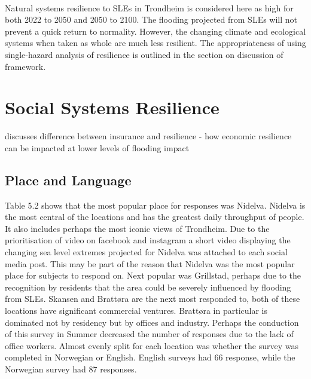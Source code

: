 \paragraph{}
Natural systems resilience to SLEs in Trondheim is considered here as high for both 2022 to 2050 and 2050 to 2100. The flooding projected from SLEs will not prevent a quick return to normality. However, the changing climate and ecological systems when taken as whole are much less resilient. The appropriateness of using single-hazard analysis of resilience is outlined in the section on discussion of framework.



\section{Social Systems Resilience}
\cite{cutter_community_2020} discusses difference between insurance and resilience - how economic resilience can be impacted at lower levels of flooding impact

\subsection{Place and Language}
Table 5.2 shows that the most popular place for responses was Nidelva. Nidelva is the most central of the locations and has the greatest daily throughput of people. It also includes perhaps the most iconic views of Trondheim. Due to the prioritisation of video on facebook and instagram a short video displaying the changing sea level extremes projected for Nidelva was attached to each social media post. This may be part of the reason that Nidelva was the most popular place for subjects to respond on.  Next popular was Grillstad, perhaps due to the recognition by residents that the area could be severely influenced by flooding from SLEs. Skansen and Brattøra are the next most responded to, both of these locations have significant commercial ventures. Brattøra in particular is dominated not by residency but by offices and industry. Perhaps the conduction of this survey in Summer decreased the number of responses due to the lack of office workers. Almost evenly split for each location was whether the survey was completed in Norwegian or English. English surveys had 66 response, while the Norwegian survey had 87 responses.
